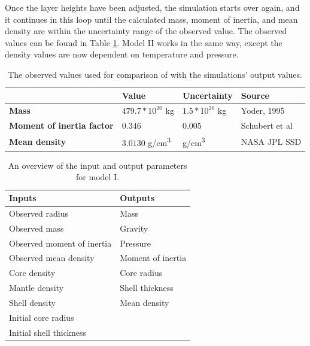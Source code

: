 \documentclass[twocolumn]{article}
\begin{document}
Once the layer heights have been adjusted, the simulation starts over again, and it continues in this loop until the calculated mass, moment of inertia, and mean density are within the uncertainty range of the observed value. The observed values can be found in Table \ref{tab:observe}. Model II works in the same way, except the density values are now dependent on temperature and pressure.

\renewcommand{\arraystretch}{1.5}
\begin{table}
	\caption{The observed values used for comparison of with the simulations' output values.}
	\medskip
	\label{tab:observe}
	\centering
	\begin{tabular}{|>{\raggedright\arraybackslash}m{}|>{\raggedright\arraybackslash}m{}|>{\raggedright\arraybackslash}m{}|>{\raggedright\arraybackslash}m{}|}
		\hline
		& \textbf{Value} & \textbf{Uncertainty} & \textbf{Source}\\ \hline
		\textbf{Mass} & $479.7*10^{20}$ kg & $1.5*10^{20}$ kg & Yoder, 1995\\ \hline
		\textbf{Moment of inertia factor} & $0.346$ & $0.005$ & Schubert et al\\ \hline
		\textbf{Mean density} & $3.0130$ g/cm\textsuperscript{3} & 0.0017 g/cm\textsuperscript{3} & NASA JPL SSD \\ \hline
	\end{tabular}
\end{table}

\renewcommand{\arraystretch}{1.2}
\begin{table}[h]
	\caption{An overview of the input and output parameters for model I.}
	\medskip
	\label{tab:inputoutput1}
	\centering
		\begin{tabular}{ll}
			\textbf{Inputs} & \textbf{Outputs}  \\ \hline
			Observed radius & Mass              \\
			Observed mass   & Gravity           \\
			Observed moment of inertia & Pressure \\
			Observed mean density & Moment of inertia \\
			Core density    & Core radius          \\
			Mantle density  &  Shell thickness\\
			Shell density   &  Mean density      \\
			Initial core radius &   \\
			Initial shell thickness
		\end{tabular}%
\end{table}
\end{document}
